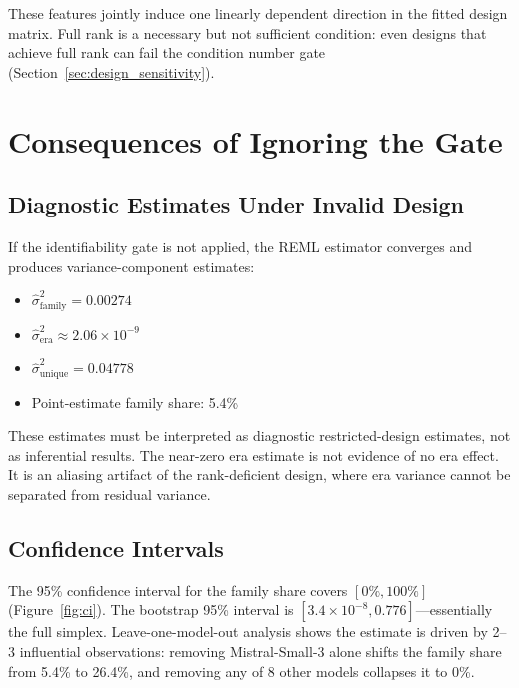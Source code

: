\documentclass[journal]{IEEEtran}
\begin{document}
These features jointly induce one linearly dependent direction in the fitted design matrix. Full rank is a necessary but not sufficient condition: even designs that achieve full rank can fail the condition number gate (Section~\ref{sec:design_sensitivity}).

\section{Consequences of Ignoring the Gate}
\label{sec:consequences}

\subsection{Diagnostic Estimates Under Invalid Design}

If the identifiability gate is not applied, the REML estimator converges and produces variance-component estimates:
\begin{itemize}
\item $\hat{\sigma}^2_{\text{family}} = 0.00274$
\item $\hat{\sigma}^2_{\text{era}} \approx 2.06 \times 10^{-9}$
\item $\hat{\sigma}^2_{\text{unique}} = 0.04778$
\item Point-estimate family share: 5.4\%
\end{itemize}

These estimates must be interpreted as diagnostic restricted-design estimates, not as inferential results. The near-zero era estimate is not evidence of no era effect. It is an aliasing artifact of the rank-deficient design, where era variance cannot be separated from residual variance.

\subsection{Confidence Intervals}

The 95\% confidence interval for the family share covers $[0\%, 100\%]$ (Figure~\ref{fig:ci}). The bootstrap 95\% interval is $[3.4 \times 10^{-8}, 0.776]$---essentially the full simplex. Leave-one-model-out analysis shows the estimate is driven by 2--3 influential observations: removing Mistral-Small-3 alone shifts the family share from 5.4\% to 26.4\%, and removing any of 8 other models collapses it to 0\%.
\end{document}
